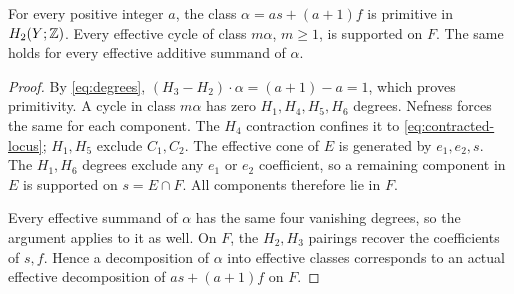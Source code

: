 \begin{proposition}\label{prop:support}
For every positive integer $a$, the class $\alpha=as+(a+1)f$ is primitive in $H_2(Y;\mathbb Z)$.
Every effective cycle of class $m\alpha$, $m\ge1$, is supported on
$F$. The same holds for every effective additive summand of $\alpha$.
\end{proposition}
\begin{proof}
By \eqref{eq:degrees}, $(H_3-H_2)\cdot\alpha=(a+1)-a=1$,
which proves primitivity. A cycle in class $m\alpha$ has zero
$H_1,H_4,H_5,H_6$ degrees. Nefness forces the same for each
component. The $H_4$ contraction confines it to
\eqref{eq:contracted-locus}; $H_1,H_5$ exclude $C_1,C_2$.
The effective cone of $E$ is generated by $e_1,e_2,s$.
The $H_1,H_6$ degrees exclude any $e_1$ or $e_2$ coefficient,
so a remaining component in $E$ is supported on $s=E\cap F$.
All components therefore lie in $F$.

Every effective summand of $\alpha$ has the same four vanishing
degrees, so the argument applies to it as well. On $F$, the
$H_2,H_3$ pairings recover the coefficients of $s,f$. Hence a
decomposition of $\alpha$ into effective classes corresponds to
an actual effective decomposition of $as+(a+1)f$ on $F$.
\end{proof}
